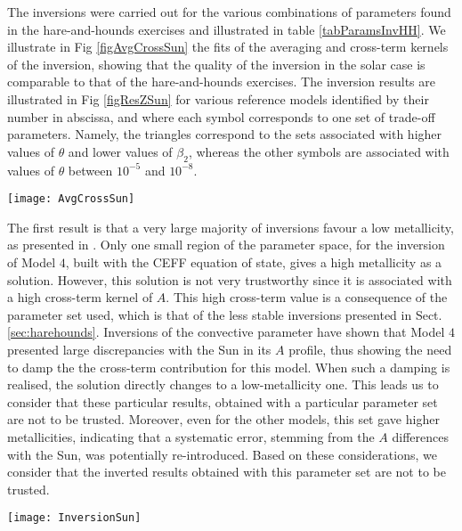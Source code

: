 \documentclass[a4paper,fleqn,usenatbib]{mnras}
\begin{document}
The inversions were carried out for the various combinations of parameters found in the hare-and-hounds exercises and illustrated in table \ref{tabParamsInvHH}. We illustrate in Fig \ref{figAvgCrossSun} the fits of the averaging and cross-term kernels of the inversion, showing that the quality of the inversion in the solar case is comparable to that of the hare-and-hounds exercises. The inversion results are illustrated in Fig \ref{figResZSun} for various reference models identified by their number in abscissa, and where each symbol corresponds to one set of trade-off parameters. Namely, the triangles correspond to the sets associated with higher values of $\theta$ and lower values of $\beta_{2}$, whereas the other symbols are associated with values of $\theta$ between $10^{-5}$ and $10^{-8}$.

 \begin{figure*}
	\centering
		\texttt{[image: AvgCrossSun]}
	\caption{Same as figure \ref{figAvgCross} for a solar inversion.}
		\label{figAvgCrossSun}
\end{figure*} 
The first result is that a very large majority of inversions favour a low metallicity, as presented in \citet{Vorontsov}. Only one small region of the parameter space, for the inversion of Model $4$, built with the CEFF equation of state, gives a high metallicity as a solution. However, this solution is not very trustworthy since it is associated with a high cross-term kernel of $A$. This high cross-term value is a consequence of the parameter set used, which is that of the less stable inversions presented in Sect. \ref{sec:harehounds}. Inversions of the convective parameter have shown that Model $4$ presented large discrepancies with the Sun in its $A$ profile, thus showing the need to damp the the cross-term contribution for this model. When such a damping is realised, the solution directly changes to a low-metallicity one. This leads us to consider that these particular results, obtained with a particular parameter set are not to be trusted. Moreover, even for the other models, this set gave higher metallicities, indicating that a systematic error, stemming from the $A$ differences with the Sun, was potentially re-introduced. Based on these considerations, we consider that the inverted results obtained with this parameter set are not to be trusted.
 \begin{figure*}
	\centering
		\texttt{[image: InversionSun]}
	\caption{Inversion results for various solar models. The reference metallicity values are ploted as red $\medstar$, while the inverted values are given in blue with each symbol corresponding to a trade-off parameters set. Model $6$ and $7$ are excluded from the plot (see manuscript for further comment).}
		\label{figResZSun}
\end{figure*} 
\end{document}
